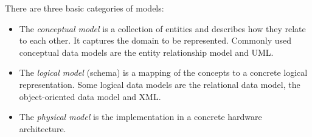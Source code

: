 There are three basic categories of models:
\begin{itemize}
\item The \emph{conceptual model} is a collection of entities and describes how they relate to each other. It captures the domain to be represented. Commonly used conceptual data models are the entity relationship model and UML.
\item The \emph{logical model} (schema) is a mapping of the concepts to a concrete logical representation. Some logical data models are the relational data model, the object-oriented data model and XML.
\item The \emph{physical model} is the implementation in a concrete hardware architecture.
\end{itemize}


